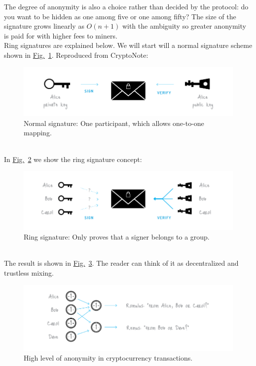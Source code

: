 The degree of anonymity is also a choice rather than decided by the protocol: do you want to be hidden as one among five or one among fifty? The size of the signature grows linearly as $O(n+1)$ with the ambiguity so greater anonymity is paid for with higher fees to miners.\\

\noindent Ring signatures are explained below. We will start will a normal signature scheme shown in \hyperref[fig:normal_sig]{Fig.}~\ref{fig:normal_sig}. Reproduced from CryptoNote:\\
\begin{figure}[ht]
  \centering
  \includegraphics[width=0.9 \columnwidth,keepaspectratio]{Images/CryptoNote/normal_sig.png}
  \caption{Normal signature: One participant, which allows one-to-one mapping.}
  \label{fig:normal_sig}
\end{figure}\\
In \hyperref[fig:ring_sig]{Fig.}~\ref{fig:ring_sig} we show the ring signature concept:\\
\begin{figure}[ht]
  \centering
  \includegraphics[width=0.9 \columnwidth,keepaspectratio]{Images/CryptoNote/ring_sig.png}
  \caption{Ring signature: Only proves that a signer belongs to a group.}
  \label{fig:ring_sig}
\end{figure}\\
The result is shown in \hyperref[fig:result]{Fig.}~\ref{fig:result}. The reader can think of it as decentralized and trustless mixing.
\begin{figure}[ht]
  \centering
  \includegraphics[width=0.9 \columnwidth,keepaspectratio]{Images/CryptoNote/result.png}
  \caption{High level of anonymity in cryptocurrency transactions.}
  \label{fig:result}
\end{figure}

